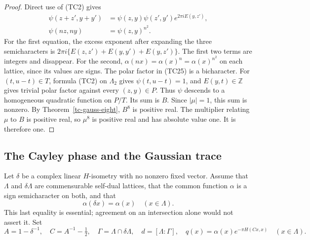 \begin{proof}
Direct use of (TC2) gives
\[
 \begin{split}
 \psi(z+z',y+y')&=\psi(z,y)\psi(z',y')
                                      e^{2\pi iE(y,z')},\\
 \psi(nz,ny)&=\psi(z,y)^{n^2}.
 \end{split}
 \tag{TC25}
\]
For the first equation, the excess exponent after expanding
the three semicharacters is
$2\pi i\{E(z,z')+E(y,y')+E(y,z')\}$.
The first two terms are integers and disappear.
For the second, $\alpha(nx)=\alpha(x)^n
=\alpha(x)^{n^2}$ on each lattice, since its values are signs.
The polar factor in (TC25) is a bicharacter.
For $(t,u-t)\in T$, formula (TC2) on $\Lambda_2$ gives
$\psi(t,u-t)=1$, and $E(y,t)\in\mathbb Z$ gives trivial
polar factor against every $(z,y)\in P$.
Thus $\psi$ descends to a homogeneous quadratic function
on $P/T$.  Its sum is $B$.
Since $|\mu|=1$, this sum is nonzero.  By
Theorem~\ref{tc-gauss-eight}, $B^8$ is positive real.
The multiplier relating $\mu$ to $B$ is positive real,
so $\mu^8$ is positive real and has absolute value one.
It is therefore one.
\end{proof}

\subsection{The Cayley phase and the Gaussian trace}

Let $\delta$ be a complex linear $H$-isometry with no nonzero
fixed vector.  Assume that $\Lambda$ and $\delta\Lambda$
are commensurable self-dual lattices, that the common function
$\alpha$ is a sign semicharacter on both, and that
\[
                         \alpha(\delta x)=\alpha(x)
                                      \quad(x\in\Lambda).
 \tag{TC26}
\]
This last equality is essential; agreement on an intersection
alone would not assert it.
Set
\[
 A=1-\delta^{-1},\quad C=A^{-1}-\tfrac12,\quad
 \Gamma=\Lambda\cap\delta\Lambda,\quad d=[\Lambda:\Gamma],
 \quad
 q(x)=\alpha(x)e^{-\pi H(Cx,x)}\quad(x\in\Lambda).
 \tag{TC27}
\]

